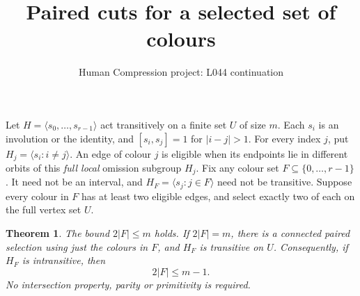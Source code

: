 \documentclass[11pt,a4paper]{article}
\title{Paired cuts for a selected set of colours}
\author{Human Compression project: L044 continuation}
\date{}
\newtheorem{theorem}{Theorem}
\newcommand{\gen}[1]{\langle#1\rangle}
\begin{document}
\maketitle
Let $H=\gen{s_0,\ldots,s_{r-1}}$ act transitively on a finite set
$U$ of size $m$. Each $s_i$ is an involution or the identity, and
$[s_i,s_j]=1$ for $|i-j|>1$. For every index $j$, put
$H_j=\gen{s_i:i\ne j}$. An edge of colour $j$ is eligible when
its endpoints lie in different orbits of this \emph{full local}
omission subgroup $H_j$.
Fix any colour set $F\subseteq\{0,\ldots,r-1\}$. It need not be
an interval, and $H_F=\gen{s_j:j\in F}$ need not be transitive.
Suppose every colour in $F$ has at least two eligible edges, and
select exactly two of each on the full vertex set $U$.

\begin{theorem}\label{main}
The bound $2|F|\leq m$ holds. If $2|F|=m$, there is a connected
paired selection using just the colours in $F$, and $H_F$ is
transitive on $U$. Consequently, if $H_F$ is intransitive, then
\[
                    2|F|\leq m-1.                 \tag{1}
\]
No intersection property, parity or primitivity is required.
\end{theorem}
\end{document}
